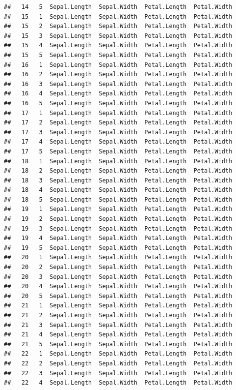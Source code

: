 \documentclass[
]{book}
\begin{document}
\begin{verbatim}
##   14   5  Sepal.Length  Sepal.Width  Petal.Length  Petal.Width
##   15   1  Sepal.Length  Sepal.Width  Petal.Length  Petal.Width
##   15   2  Sepal.Length  Sepal.Width  Petal.Length  Petal.Width
##   15   3  Sepal.Length  Sepal.Width  Petal.Length  Petal.Width
##   15   4  Sepal.Length  Sepal.Width  Petal.Length  Petal.Width
##   15   5  Sepal.Length  Sepal.Width  Petal.Length  Petal.Width
##   16   1  Sepal.Length  Sepal.Width  Petal.Length  Petal.Width
##   16   2  Sepal.Length  Sepal.Width  Petal.Length  Petal.Width
##   16   3  Sepal.Length  Sepal.Width  Petal.Length  Petal.Width
##   16   4  Sepal.Length  Sepal.Width  Petal.Length  Petal.Width
##   16   5  Sepal.Length  Sepal.Width  Petal.Length  Petal.Width
##   17   1  Sepal.Length  Sepal.Width  Petal.Length  Petal.Width
##   17   2  Sepal.Length  Sepal.Width  Petal.Length  Petal.Width
##   17   3  Sepal.Length  Sepal.Width  Petal.Length  Petal.Width
##   17   4  Sepal.Length  Sepal.Width  Petal.Length  Petal.Width
##   17   5  Sepal.Length  Sepal.Width  Petal.Length  Petal.Width
##   18   1  Sepal.Length  Sepal.Width  Petal.Length  Petal.Width
##   18   2  Sepal.Length  Sepal.Width  Petal.Length  Petal.Width
##   18   3  Sepal.Length  Sepal.Width  Petal.Length  Petal.Width
##   18   4  Sepal.Length  Sepal.Width  Petal.Length  Petal.Width
##   18   5  Sepal.Length  Sepal.Width  Petal.Length  Petal.Width
##   19   1  Sepal.Length  Sepal.Width  Petal.Length  Petal.Width
##   19   2  Sepal.Length  Sepal.Width  Petal.Length  Petal.Width
##   19   3  Sepal.Length  Sepal.Width  Petal.Length  Petal.Width
##   19   4  Sepal.Length  Sepal.Width  Petal.Length  Petal.Width
##   19   5  Sepal.Length  Sepal.Width  Petal.Length  Petal.Width
##   20   1  Sepal.Length  Sepal.Width  Petal.Length  Petal.Width
##   20   2  Sepal.Length  Sepal.Width  Petal.Length  Petal.Width
##   20   3  Sepal.Length  Sepal.Width  Petal.Length  Petal.Width
##   20   4  Sepal.Length  Sepal.Width  Petal.Length  Petal.Width
##   20   5  Sepal.Length  Sepal.Width  Petal.Length  Petal.Width
##   21   1  Sepal.Length  Sepal.Width  Petal.Length  Petal.Width
##   21   2  Sepal.Length  Sepal.Width  Petal.Length  Petal.Width
##   21   3  Sepal.Length  Sepal.Width  Petal.Length  Petal.Width
##   21   4  Sepal.Length  Sepal.Width  Petal.Length  Petal.Width
##   21   5  Sepal.Length  Sepal.Width  Petal.Length  Petal.Width
##   22   1  Sepal.Length  Sepal.Width  Petal.Length  Petal.Width
##   22   2  Sepal.Length  Sepal.Width  Petal.Length  Petal.Width
##   22   3  Sepal.Length  Sepal.Width  Petal.Length  Petal.Width
##   22   4  Sepal.Length  Sepal.Width  Petal.Length  Petal.Width

\end{verbatim}
\end{document}
